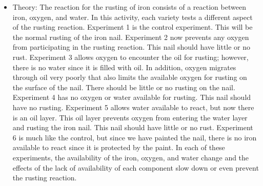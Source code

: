 \begin{itemize}
{\begin{itemize}
\item{Theory: The reaction for the rusting of iron consists of a reaction between iron, oxygen, and water. In this activity, each variety tests a different aspect of the rusting reaction. Experiment 1 is the control experiment. This will be the normal rusting of the iron nail. Experiment 2 now prevents any oxygen from participating in the rusting reaction. This nail should have little or no rust. Experiment 3 allows oxygen to encounter the oil for rusting; however, there is no water since it is filled with oil. In addition, oxygen migrates through oil very poorly that also limits the available oxygen for rusting on the surface of the nail. There should be little or no rusting on the nail. Experiment 4 has no oxygen or water available for rusting. This nail should have no rusting. Experiment 5 allows water available to react, but now there is an oil layer. This oil layer prevents oxygen from entering the water layer and rusting the iron nail. This nail should have little or no rust. Experiment 6 is much like the control, but since we have painted the nail, there is no iron available to react since it is protected by the paint. In each of these experiments, the availability of the iron, oxygen, and water change and the effects of the lack of availability of each component slow down or even prevent the rusting reaction.}
\end{itemize}

}
\end{itemize}
